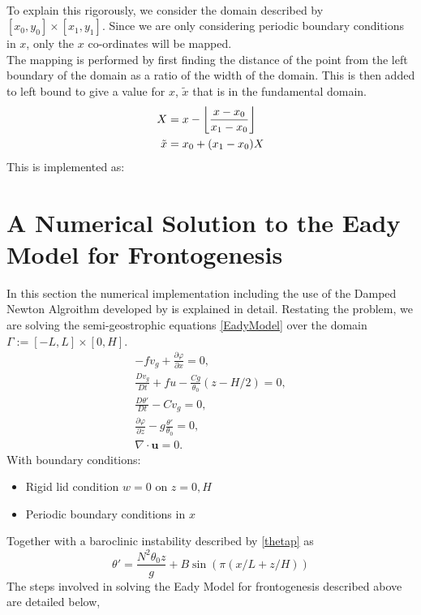 \\
To explain this rigorously, we consider the domain described by $[x_0,y_0] \times [x_1,y_1]$. Since we are only considering periodic boundary conditions in $x$, only the $x$ co-ordinates will be mapped. 
\\
The mapping is performed by first finding the distance of the point from the left boundary of the domain as a ratio of the width of the domain. This is then added to left bound to give a value for $x$, $\tilde{x}$ that is in the fundamental domain. 
\begin{equation*}
	\begin{aligned}
		X &= x - \floor*{\frac{x - x_0}{x_1 - x_0}}\\
		\tilde{x} &= x_0 + (x_1 - x_0)X
	\end{aligned}
\end{equation*}
This is implemented as:
\chapter{A Numerical Solution to the Eady Model for Frontogenesis \label{algorithm}}
In this section the numerical implementation including the use of the Damped Newton Algroithm developed by \cite{Merigot2017} is explained in detail. 
Restating the problem, we are solving the semi-geostrophic equations \ref{EadyModel} over the domain $\Gamma := [-L,L] \times [0,H]$.
\begin{equation*}
	\begin{aligned}
		-fv_g + \frac{\partial \varphi}{\partial x} = 0,\\
		\frac{Dv_g}{Dt} + fu -\frac{Cg}{\theta _0}\left(z-H/2\right) = 0,\\
		\frac{D\theta'}{Dt} - Cv_g = 0,\\
		\frac{\partial \varphi}{\partial z} - g\frac{\theta'}{\theta_0} = 0,\\
		\nabla \cdot \bm{u} = 0.
	\end{aligned}
\end{equation*}
With boundary conditions:
\vspace{-\topsep}
\begin{itemize}
	\setlength{\parskip}{0pt}
	\setlength{\itemsep}{0pt}
	\item Rigid lid condition $w = 0$ on $z = 0, H$
	\item Periodic boundary conditions in $x$
\end{itemize}
\vspace{-\topsep}
Together with a baroclinic instability described by \ref{thetap} as
\begin{equation}
\theta' = \frac{N^2\theta_0 z}{g} + B\sin\left(\pi\left(x/L + z/H\right)\right)
\end{equation}
The steps involved in solving the Eady Model for frontogenesis described above are detailed below,
